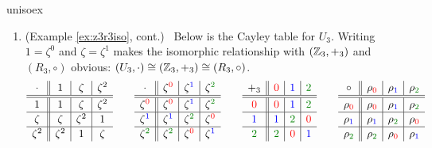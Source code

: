 \begin{examples}{}{unisoex}
\begin{enumerate}
	  
	  \item\label{ex:unisoex2} (Example \ref{ex:z3r3iso}, cont.) \ Below is the Cayley table for $U_3$. Writing $1=\zeta^0$ and $\zeta=\zeta^1$ makes the isomorphic relationship with $(\mathbb{Z}_3,+_3)$ and $(R_3,\circ)$ obvious: $(U_3,\cdot)\cong (\mathbb{Z}_3,+_3)\cong (R_3,\circ)$.
		\[
			\def\arraystretch{1.1}
			\begin{array}{c||c|c|c}
				\cdot&1&\zeta&\zeta^2\\\hline\hline
				1&1&\zeta&\zeta^2\\\hline
				\zeta&\zeta&\zeta^2&1\\\hline
				\zeta^2&\zeta^2&1&\zeta
			\end{array}
			\qquad
			\begin{array}{c||c|c|c}
				\cdot&\zeta^{\textcolor{red}{0}}&\zeta^{\textcolor{blue}{1}}&\zeta^{\textcolor{Green}{2}}\\\hline\hline
				\zeta^{\textcolor{red}{0}}&\zeta^{\textcolor{red}{0}}&\zeta^{\textcolor{blue}{1}}&\zeta^{\textcolor{Green}{2}}\\\hline
				\zeta^{\textcolor{blue}{1}}&\zeta^{\textcolor{blue}{1}}&\zeta^{\textcolor{Green}{2}}&\zeta^{\textcolor{red}{0}}\\\hline
				\zeta^{\textcolor{Green}{2}}&\zeta^{\textcolor{Green}{2}}&\zeta^{\textcolor{red}{0}}&\zeta^{\textcolor{blue}{1}}
			\end{array}
			\qquad
			\begin{array}{c||c|c|c}
				+_3&\textcolor{red}{0}&\textcolor{blue}{1}&\textcolor{Green}{2}\\\hline\hline
				\textcolor{red}{0}&\textcolor{red}{0}&\textcolor{blue}{1}&\textcolor{Green}{2}\\\hline
				\textcolor{blue}{1}&\textcolor{blue}{1}&\textcolor{Green}{2}&\textcolor{red}{0}\\\hline
				\textcolor{Green}{2}&\textcolor{Green}{2}&\textcolor{red}{0}&\textcolor{blue}{1}
			\end{array}
			\qquad
			\begin{array}{c||c|c|c}
				\circ&\rho_{\textcolor{red}{0}}&\rho_{\textcolor{blue}{1}}&\rho_{\textcolor{Green}{2}}\\\hline\hline
				\rho_{\textcolor{red}{0}}&\rho_{\textcolor{red}{0}}&\rho_{\textcolor{blue}{1}}&\rho_{\textcolor{Green}{2}}\\\hline
				\rho_{\textcolor{blue}{1}}&\rho_{\textcolor{blue}{1}}&\rho_{\textcolor{Green}{2}}&\rho_{\textcolor{red}{0}}\\\hline
				\rho_{\textcolor{Green}{2}}&\rho_{\textcolor{Green}{2}}&\rho_{\textcolor{red}{0}}&\rho_{\textcolor{blue}{1}}
			\end{array}
		\]
		

\end{enumerate}
\end{examples}
